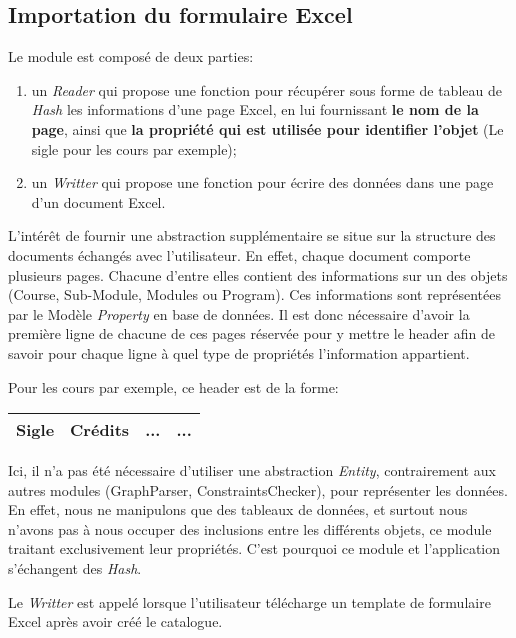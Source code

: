 \subsection{Importation du formulaire Excel}
Le module est composé de deux parties: 
\begin{enumerate}
\item un \textit{Reader} qui propose une fonction pour récupérer sous forme de tableau de \textit{Hash} les informations d'une page Excel, en lui fournissant \textbf{le nom de la page}, ainsi que \textbf{la propriété qui est utilisée pour identifier l'objet} (Le sigle pour les cours par exemple);
\item un \textit{Writter} qui propose une fonction pour écrire des données dans une page d'un document Excel.
\end{enumerate}

L'intérêt de fournir une abstraction supplémentaire se situe sur la structure des documents échangés avec l'utilisateur. En effet, chaque document comporte plusieurs pages. Chacune d'entre elles contient des informations sur un des objets (Course, Sub-Module, Modules ou Program). Ces informations sont représentées par le Modèle \textit{Property} en base de données. Il est donc nécessaire d'avoir la première ligne de chacune de ces pages réservée pour y mettre le header afin de savoir pour chaque ligne à quel type de propriétés l'information appartient.

Pour les cours par exemple, ce header est de la forme:
\begin{table}[H]
\centering
\begin{tabular}{| c | c | c | c |}
\hline
\textbf{Sigle} & \textbf{Crédits} & \textbf{...} & \textbf{...}\\
\hline
\end{tabular}  
\end{table}

Ici, il n'a pas été nécessaire d'utiliser une abstraction \textit{Entity}, contrairement aux autres modules (GraphParser, ConstraintsChecker), pour représenter les données. En effet, nous ne manipulons que des tableaux de données, et surtout nous n'avons pas à nous occuper des inclusions entre les différents objets, ce module traitant exclusivement leur propriétés. C'est pourquoi ce module et l'application s'échangent des \textit{Hash}. 


Le \textit{Writter} est appelé lorsque l'utilisateur télécharge un template de formulaire Excel après avoir créé le catalogue. 

